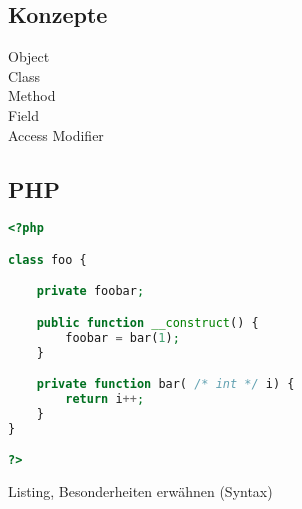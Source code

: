 \subsection{Konzepte}
\label{sec:concepts_of_object_oriented_languages}


\begin{description}
    \item[Object]
    \item[Class]
    \item[Method]
    \item[Field]
    \item[Access Modifier]    
\end{description}

\subsection{PHP}
\label{sec:php}

\begin{lstlisting}[language=php]
<?php

class foo {

    private foobar;

    public function __construct() {
        foobar = bar(1);
    } 

    private function bar( /* int */ i) {
        return i++;
    }
}

?>
\end{lstlisting}

Listing, Besonderheiten erwähnen (Syntax)

